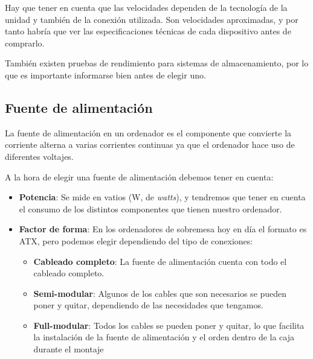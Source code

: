 Hay que tener en cuenta que las velocidades dependen de la tecnología de la unidad y también de la conexión utilizada. Son velocidades aproximadas, y por tanto habría que ver las especificaciones técnicas de cada dispositivo antes de comprarlo.


También existen pruebas de rendimiento para sistemas de almacenamiento, por lo que es importante informarse bien antes de elegir uno.


\subsection{Fuente de alimentación}

La fuente de alimentación en un ordenador es el componente que convierte la corriente alterna a varias corrientes continuas ya que el ordenador hace uso de diferentes voltajes.

A la hora de elegir una fuente de alimentación debemos tener en cuenta:

\begin{itemize}
    \item \textbf{Potencia}: Se mide en vatios (W, de \textit{watts}), y tendremos que tener en cuenta el consumo de los distintos componentes que tienen nuestro ordenador.
    \item \textbf{Factor de forma}: En los ordenadores de sobremesa hoy en día el formato es ATX, pero podemos elegir dependiendo del tipo de conexiones:
    \begin{itemize}
        \item \textbf{Cableado completo}: La fuente de alimentación cuenta con todo el cableado completo.
        \item \textbf{Semi-modular}: Algunos de los cables que son necesarios se pueden poner y quitar, dependiendo de las necesidades que tengamos.

        \item \textbf{Full-modular}: Todos los cables se pueden poner y quitar, lo que facilita la instalación de la fuente de alimentación y el orden dentro de la caja durante el montaje
    \end{itemize}
\end{itemize}


%
%
